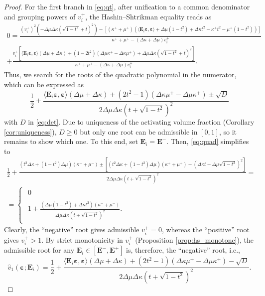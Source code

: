 \documentclass[preprint,3p]{elsarticle}
\newcommand{\tenss}[1]{\bm{\mathbf{#1}}}            %
\newcommand{\tensf}[1]{\bm{\mathbf{#1}}}            %
\newcommand{\strain}{\tenss{\varepsilon}}           %
\newcommand{\Ei}{\tensf{E}_i}                       %
\newcommand{\Emin}{\tensf{E}^{-}}                   %
\newcommand{\Emax}{\tensf{E}^{+}}                   %
\begin{document}
\begin{proof}
For the first branch in \eqref{eq:qt}, after unification to a common denominator and grouping powers of $v_i^+$, the Hashin--Shtrikman equality reads as
%
\begin{multline}
    0 = \frac{(v_i^+)^2 (-\Delta\mu \Delta\kappa (\sqrt{1-t^2} + t)^2) - [(\kappa^+ + \mu^+)(\langle\Ei\strain, \strain\rangle + \Delta\mu (1-t^2) + \Delta\kappa t^2 - \kappa^+ t^2 - \mu^+(1-t^2))]}{\kappa^+ + \mu^+ - (\Delta\kappa + \Delta\mu) v_i^+}\\
    + \frac{v_i^+\left[\langle\Ei\strain, \strain\rangle (\Delta\mu + \Delta\kappa) + (1 - 2t^2) (\Delta\mu \kappa^+ - \Delta\kappa\mu^+) + \Delta\mu \Delta\kappa (\sqrt{1-t^2} + t)^2\right]}{\kappa^+ + \mu^+ - (\Delta\kappa + \Delta\mu) v_i^+}.
\end{multline}
%
Thus, we search for the roots of the quadratic polynomial in the numerator, which can be expressed as
%
\begin{equation}\label{eq:quad}
    \frac{1}{2} + \frac{\langle\Ei\strain, \strain\rangle(\Delta\mu + \Delta\kappa) + (2t^2-1)(\Delta\kappa \mu^+ -\Delta\mu \kappa^+) \pm \sqrt{D}}{2 \Delta\mu \Delta\kappa (t + \sqrt{1 - t^2})^2}
\end{equation}
%
with $D$ in \eqref{eq:det}. Due to uniqueness of the activating volume fraction (Corollary \ref{cor:uniqueness}), $D\ge 0$ but only one root can be admissible in $[0,1]$, so it remains to show which one. To this end, set $\Ei=\Emin$. Then, \eqref{eq:quad} simplifies to
%
\begin{multline}
    \frac{1}{2}+\frac{(t^2\Delta\kappa + (1-t^2)\Delta\mu)(\kappa^- + \mu^-) \pm [(t^2\Delta\kappa + (1 - t^2)\Delta\mu) (\kappa^+ + \mu^+) - ( \Delta\kappa t - \Delta\mu \sqrt{1-t^2})^2]}{2 \Delta\mu \Delta\kappa (t + \sqrt{1 - t^2})^2} = \\
    = \begin{cases}
        \begin{aligned}0\end{aligned}\\
        \begin{aligned}1 + \frac{(\Delta\mu (1-t^2) + \Delta\kappa t^2)(\kappa^- + \mu^-)}{\Delta\mu \Delta\kappa (t + \sqrt{1-t^2})^2 }.\end{aligned}
    \end{cases}
\end{multline}
%
Clearly, the ``negative'' root gives admissible $v_i^+ = 0$, whereas the ``positive'' root gives $v_i^+ > 1$. By strict monotonicity in $v_i^+$ (Proposition \ref{prop:hs_monotone}), the admissible root for any $\Ei \in [\Emin, \Emax]$ is, therefore, the ``negative'' root, i.e.,
%
\begin{equation}
    \hat{v}_1 (\strain;\Ei) =
        \frac{1}{2} + \frac{\langle\Ei\strain, \strain\rangle(\Delta\mu + \Delta\kappa) + (2t^2-1)(\Delta\kappa \mu^+ -\Delta\mu \kappa^+) - \sqrt{D}}{2 \Delta\mu \Delta\kappa (t + \sqrt{1 - t^2})^2}.
\end{equation}


\end{proof}
\end{document}
